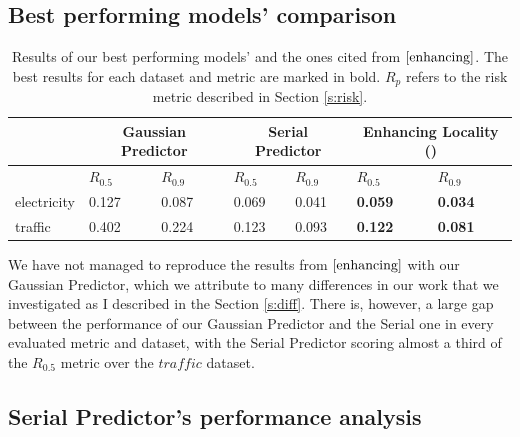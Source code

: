 \documentclass[en]{pracamgr}
\begin{document}
	\subsection*{Best performing models' comparison}
	
	\begin{table}[h]
		\begin{center}
			\begin{tabular}
				{ |p{2cm}|p{1.5cm}|p{1.5cm}||p{1.5cm}|p{1.5cm}||p{1.5cm}|p{1.5cm}|  }
				\hline
				& \multicolumn{2}{c||}{Gaussian Predictor} & \multicolumn{2}{|c||}{Serial Predictor} & \multicolumn{2}{|c|}{Enhancing Locality (\cite{enhancing})} \\
				\hline
				& \hfil $R_{0.5}$ & \hfil $R_{0.9}$ & \hfil $R_{0.5}$ & \hfil $R_{0.9}$
				& \hfil $R_{0.5}$ & \hfil $R_{0.9}$
				\\
				\hline
				electricity & \hfil 0.127   & \hfil 0.087    & \hfil 0.069 &   \hfil 0.041 & \hfil \textbf{0.059} & \hfil \textbf{0.034} 
				\\
				traffic &  \hfil 0.402   & \hfil 0.224   & \hfil 0.123 &   \hfil 0.093 & \hfil \textbf{0.122} & \hfil \textbf{0.081}\\
				\hline
			\end{tabular}
			\caption{\label{tab:results}Results of our best performing models' and the ones cited from $\cite{enhancing}$. The best results for each dataset and metric are marked in bold. $R_{p}$ refers to the risk metric described in Section \ref{s:risk}.}
		\end{center}
	\end{table}
	
	We have not managed to reproduce the results from $\cite{enhancing}$ with our Gaussian Predictor, which we attribute to many differences in our work that we investigated as I described in the Section \ref{s:diff}. There is, however, a large gap between the performance of our Gaussian Predictor and the Serial one in every evaluated metric and dataset, with the Serial Predictor scoring almost a third of the $R_{0.5}$ metric over the $traffic$ dataset.
	
	\subsection*{Serial Predictor's performance analysis}
	
\end{document}
